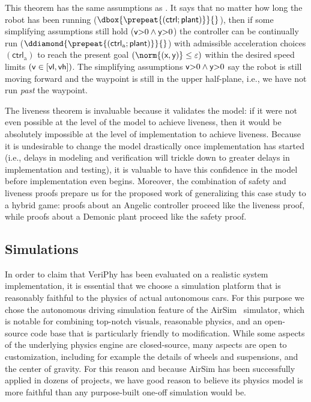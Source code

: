 \documentclass[12pt]{cmuthesis}
\theoremstyle{definition}
\theoremstyle{remark}
\newcommand{\xgvar}{\textsf{x}}
\newcommand{\ygvar}{\textsf{y}}
\newcommand{\yvar}{\textsf{y}}
\newcommand{\vlvar}{\textsf{vl}}
\newcommand{\vhvar}{\textsf{vh}}
\newcommand{\vvar}{{\sf v}\xspace}
\newcommand{\ctrl}{\textsf{ctrl}\xspace}
\newcommand{\ctrlliv}{\ctrl_{\text{a}}}
\newcommand{\plant}{\textsf{plant}\xspace}
\newcommand{\enorm}[1]{\norm{#1}}
\newcommand{\rref}[2][]{\prettyref{#2}}
\newcommand{\VeriPhy}{VeriPhy\xspace}
\begin{document}
This theorem has the same assumptions as \rref{thm:safe}. 
It says that no matter how long the robot has been running ($\dbox{\prepeat{(\ctrl;\plant)}}{}$), 
then if some simplifying assumptions still hold ($\vvar{>}0\land\yvar{>}0$) 
the controller can be continually run ($\ddiamond{\prepeat{(\ctrlliv;\plant)}}{}$) with admissible acceleration choices $(\ctrlliv)$ to reach the present goal \((\enorm{(\xgvar,\ygvar)} \leq \veps)\) within the desired speed limits \((\vvar \in [\vlvar,\vhvar])\).
The simplifying assumptions $\vvar{>}0\land\yvar{>}0$ say the robot is still moving forward and the waypoint is still in the upper half-plane, i.e., we have not run \emph{past} the waypoint.

The liveness theorem is invaluable because it validates the \dL model: if it were not even possible at the level of the \dL model to achieve liveness, then it would be absolutely impossible at the level of implementation to achieve liveness.
Because it is undesirable to change the model drastically once implementation has started (i.e., delays in modeling and verification will trickle down to greater delays in implementation and testing), it is valuable to have this confidence in the model before implementation even begins.
Moreover, the combination of safety and liveness proofs prepare us for the proposed work of generalizing this case study to a hybrid game: proofs about an Angelic controller proceed like the liveness proof, while proofs about a Demonic plant proceed like the safety proof.

\subsection{Simulations}
In order to claim that \VeriPhy has been evaluated on a realistic system implementation, it is essential that we choose a simulation platform that is reasonably faithful to the physics of actual autonomous cars.
For this purpose we chose the autonomous driving simulation feature of the AirSim~\cite{shah2018airsim} simulator, which is notable for combining top-notch visuals, reasonable physics, and an open-source code base that is particularly friendly to modification.
While some aspects of the underlying physics engine are closed-source, many aspects are open to customization, including for example the details of wheels and suspensions, and the center of gravity.
For this reason and because AirSim has been successfully applied in dozens of projects, we have good reason to believe its physics model is more faithful than any purpose-built one-off simulation would be.
\end{document}
